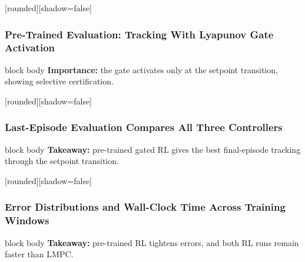 \documentclass[aspectratio=169]{beamer}
\begin{document}
\begin{frame}
[rounded][shadow=false]
\frametitle{\large \textbf{Pre-Trained Evaluation: Tracking With Lyapunov Gate Activation}}
\scriptsize

\vspace{-0.22cm}
\begin{center}
\centering
\resizebox{0.875\textwidth}{!}{\PretrainEpisodeGateFigure}
\end{center}

\vspace{-0.08cm}
\begin{beamercolorbox}[rounded=true,sep=4pt,wd=0.94\textwidth]{block body}
\textbf{Importance:} the gate activates only at the setpoint transition, showing selective certification.
\end{beamercolorbox}

\end{frame}

\begin{frame}
[rounded][shadow=false]
\frametitle{\large \textbf{Last-Episode Evaluation Compares All Three Controllers}}
\scriptsize

\vspace{-0.20cm}
\begin{center}
\centering
\resizebox{0.86\textwidth}{!}{\LastEpisodeEvaluationFigure}
\end{center}

\vspace{-0.05cm}
\begin{beamercolorbox}[rounded=true,sep=4pt,wd=0.94\textwidth]{block body}
\textbf{Takeaway:} pre-trained gated RL gives the best final-episode tracking through the setpoint transition.
\end{beamercolorbox}

\end{frame}

\begin{frame}
[rounded][shadow=false]
\frametitle{\large \textbf{Error Distributions and Wall-Clock Time Across Training Windows}}
\scriptsize

\vspace{-0.24cm}
\begin{center}
\centering
\resizebox{0.86\textwidth}{!}{\MetricBoxRuntimeFigure}
\end{center}

\vspace{-0.08cm}
\begin{beamercolorbox}[rounded=true,sep=4pt,wd=0.94\textwidth]{block body}
\textbf{Takeaway:} pre-trained RL tightens errors, and both RL runs remain faster than LMPC.
\end{beamercolorbox}

\end{frame}
\end{document}
